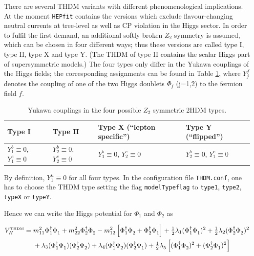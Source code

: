 \documentclass[aps,superscriptaddress,nofootinbib,floatfix,notitlepage]{revtex4-1}
\newcommand{\HEPfit}{\texttt{HEPfit}\xspace}
\begin{document}
There are several THDM variants with different phenomenological implications. At the moment \HEPfit contains the versions which exclude flavour-changing neutral currents at tree-level as well as CP violation in the Higgs sector. In order to fulfil the first demand, an additional softly broken $Z_2$ symmetry is assumed, which can be chosen in four different ways; thus these versions are called type I, type II, type X and type Y. (The THDM of type II contains the scalar Higgs part of supersymmetric models.) The four types only differ in the Yukawa couplings of the Higgs fields; the corresponding assignments can be found in Table \ref{tab:THDMtypes}, where $Y^f_j$ denotes the coupling of one of the two Higgs doublets $\Phi_j$ (j=1,2) to the fermion field $f$.

\begin{table}[htb]
  \centering
\caption{Yukawa couplings in the four possible $Z_2$ symmetric 2HDM types.}\vspace{0.2cm}
  \begin{tabular}{|l|l|l|l|}
    \hline
      Type I & Type II & Type X (``lepton specific'') & Type Y (``flipped'') \\
    \hline
      $Y^b_{1}\equiv 0$, $Y^e_{1}\equiv 0$ & $Y^b_{2}\equiv 0$, $Y^e_{2}\equiv 0$ & $Y^b_{1}\equiv 0$, $Y^e_{2}\equiv 0$ & $Y^b_{2}\equiv 0$, $Y^e_{1}\equiv 0$ \\
      \hline
  \end{tabular}
 \label{tab:THDMtypes}
\end{table} 

By definition, $Y_1^u \equiv 0$ for all four types. In the configuration file \texttt{THDM.conf}, one has to choose the THDM type setting the flag \texttt{modelTypeflag} to \texttt{type1}, \texttt{type2}, \texttt{typeX} or \texttt{typeY}.

Hence we can write the Higgs potential for $\Phi_1$ and $\Phi_2$ as

\begin{align}
V_H^\text{\tiny{THDM}} & = m_{11}^2\Phi_1^\dagger\Phi_1^{\phantom{\dagger}}
 	+m_{22}^2\Phi_2^\dagger\Phi_2^{\phantom{\dagger}}
 	-m_{12}^2\left[ \Phi_1^\dagger\Phi_2^{\phantom{\dagger}}
 		+\Phi_2^\dagger\Phi_1^{\phantom{\dagger}}\right] 
	+\tfrac12 \lambda_1(\Phi_1^\dagger\Phi_1^{\phantom{\dagger}})^2 
	+\tfrac12 \lambda_2(\Phi_2^\dagger\Phi_2^{\phantom{\dagger}})^2 \nonumber \\
&\phantom{{}={}}
 	+\lambda_3(\Phi_1^\dagger\Phi_1^{\phantom{\dagger}})
 		(\Phi_2^\dagger\Phi_2^{\phantom{\dagger}})
 	+\lambda_4(\Phi_1^\dagger\Phi_2^{\phantom{\dagger}})
 		(\Phi_2^\dagger\Phi_1^{\phantom{\dagger}})
	+\tfrac12 \lambda_5^{} \left[ (\Phi_1^\dagger\Phi_2^{\phantom{\dagger}})^2
 		+(\Phi_2^\dagger\Phi_1^{\phantom{\dagger}})^2 \right] \label{eq:THDMVH}
\end{align}
 
\end{document}
